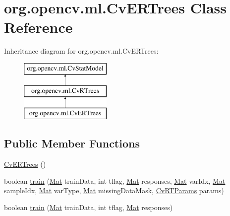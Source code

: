 \hypertarget{classorg_1_1opencv_1_1ml_1_1_cv_e_r_trees}{}\section{org.\+opencv.\+ml.\+Cv\+E\+R\+Trees Class Reference}
\label{classorg_1_1opencv_1_1ml_1_1_cv_e_r_trees}
Inheritance diagram for org.\+opencv.\+ml.\+Cv\+E\+R\+Trees\+:\begin{figure}[H]
\begin{center}
\leavevmode
\includegraphics[height=3.000000cm]{classorg_1_1opencv_1_1ml_1_1_cv_e_r_trees}
\end{center}
\end{figure}
\subsection*{Public Member Functions}
\begin{DoxyCompactItemize}
\item 
\mbox{\hyperlink{classorg_1_1opencv_1_1ml_1_1_cv_e_r_trees_a334ff3b10f27819ff1ea1d11fa611d90}{Cv\+E\+R\+Trees}} ()
\item 
boolean \mbox{\hyperlink{classorg_1_1opencv_1_1ml_1_1_cv_e_r_trees_a4a16b25cfcba299249238d4d4c6b3c79}{train}} (\mbox{\hyperlink{classorg_1_1opencv_1_1core_1_1_mat}{Mat}} train\+Data, int tflag, \mbox{\hyperlink{classorg_1_1opencv_1_1core_1_1_mat}{Mat}} responses, \mbox{\hyperlink{classorg_1_1opencv_1_1core_1_1_mat}{Mat}} var\+Idx, \mbox{\hyperlink{classorg_1_1opencv_1_1core_1_1_mat}{Mat}} sample\+Idx, \mbox{\hyperlink{classorg_1_1opencv_1_1core_1_1_mat}{Mat}} var\+Type, \mbox{\hyperlink{classorg_1_1opencv_1_1core_1_1_mat}{Mat}} missing\+Data\+Mask, \mbox{\hyperlink{classorg_1_1opencv_1_1ml_1_1_cv_r_t_params}{Cv\+R\+T\+Params}} params)
\item 
boolean \mbox{\hyperlink{classorg_1_1opencv_1_1ml_1_1_cv_e_r_trees_a00e7a35327d4fcc8f6c3835e832d0d0e}{train}} (\mbox{\hyperlink{classorg_1_1opencv_1_1core_1_1_mat}{Mat}} train\+Data, int tflag, \mbox{\hyperlink{classorg_1_1opencv_1_1core_1_1_mat}{Mat}} responses)
\end{DoxyCompactItemize}

